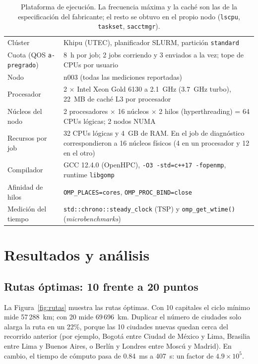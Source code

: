\documentclass[12pt,a4paper]{article}
\begin{document}
\begin{table}[H]
\centering
\caption{Plataforma de ejecución. La frecuencia máxima y la caché son las de la especificación del fabricante; el resto se obtuvo en el propio nodo (\texttt{lscpu}, \texttt{taskset}, \texttt{sacctmgr}).}
\label{tab:hw}
\small
\begin{tabular}{L{0.24\textwidth}L{0.68\textwidth}}
\toprule
Clúster & Khipu (UTEC), planificador SLURM, partición \texttt{standard} \\
Cuota (QOS \texttt{a-pregrado}) & 8~h por job; 2 jobs corriendo y 3 enviados a la vez; tope de CPUs por usuario \\
Nodo & n003 (todas las mediciones reportadas) \\
Procesador & 2 $\times$ Intel Xeon Gold 6130 a 2.1~GHz (3.7~GHz turbo), 22~MB de caché L3 por procesador \\
Núcleos del nodo & 2 procesadores $\times$ 16 núcleos $\times$ 2 hilos (hyperthreading) = 64 CPUs lógicas; 2 nodos NUMA \\
Recursos por job & 32 CPUs lógicas y 4~GB de RAM. En el job de diagnóstico correspondieron a 16 núcleos físicos (4 en un procesador y 12 en el otro) \\
Compilador & GCC 12.4.0 (OpenHPC), \texttt{-O3 -std=c++17 -fopenmp}, runtime \texttt{libgomp} \\
Afinidad de hilos & \texttt{OMP\_PLACES=cores}, \texttt{OMP\_PROC\_BIND=close} \\
Medición del tiempo & \texttt{std::chrono::steady\_clock} (TSP) y \texttt{omp\_get\_wtime()} (\textit{microbenchmarks}) \\
\bottomrule
\end{tabular}
\end{table}

\section{Resultados y análisis}
\label{sec:resultados}

\subsection{Rutas óptimas: 10 frente a 20 puntos}

La Figura~\ref{fig:rutas} muestra las rutas óptimas. Con 10 capitales el ciclo mínimo mide 57\,288~km; con 20 mide 69\,696~km. Duplicar el número de ciudades solo alarga la ruta en un 22\%, porque las 10 ciudades nuevas quedan cerca del recorrido anterior (por ejemplo, Bogotá entre Ciudad de México y Lima, Brasilia entre Lima y Buenos Aires, o Berlín y Londres entre Moscú y Madrid). En cambio, el tiempo de cómputo pasa de 0.84~ms a 407~s: un factor de $4.9\times 10^{5}$.
\end{document}
